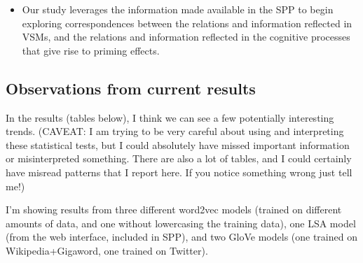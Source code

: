 \documentclass{article}
\begin{document}
\begin{itemize}
\item Our study leverages the information made available in the SPP to begin exploring correspondences between the relations and information reflected in VSMs, and the relations and information reflected in the cognitive processes that give rise to priming effects.

\end{itemize}

\subsection{Observations from current results} 
In the results (tables below), I think we can see a few potentially interesting trends. (CAVEAT: I am trying to be very careful about using and interpreting these statistical tests, but I could absolutely have missed important information or misinterpreted something. There are also a lot of tables, and I could certainly have misread patterns that I report here. If you notice something wrong just tell me!)

I'm showing results from three different word2vec models (trained on different amounts of data, and one without lowercasing the training data), one LSA model (from the web interface, included in SPP), and two GloVe models (one trained on Wikipedia+Gigaword, one trained on Twitter). 
\end{document}
